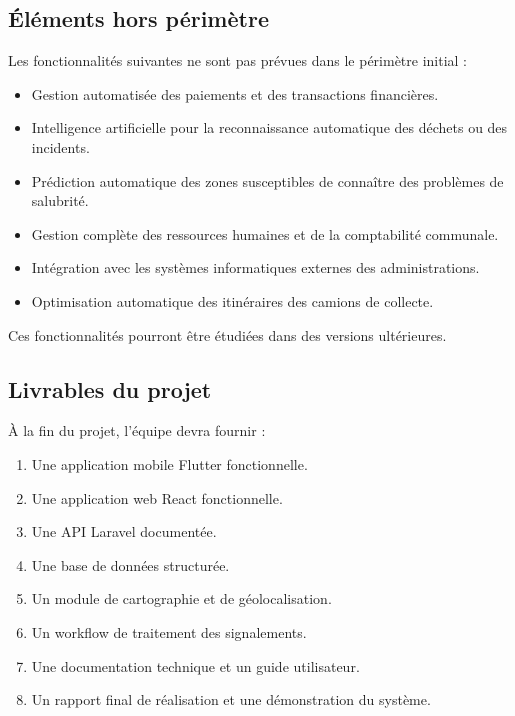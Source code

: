 \documentclass[11pt,a4paper,oneside]{report}
\begin{document}
	\subsection{Éléments hors périmètre}
	
	Les fonctionnalités suivantes ne sont pas prévues
	dans le périmètre initial :
	
	\begin{itemize}
		\item Gestion automatisée des paiements et
		des transactions financières.
		\item Intelligence artificielle pour la reconnaissance
		automatique des déchets ou des incidents.
		\item Prédiction automatique des zones susceptibles
		de connaître des problèmes de salubrité.
		\item Gestion complète des ressources humaines
		et de la comptabilité communale.
		\item Intégration avec les systèmes informatiques
		externes des administrations.
		\item Optimisation automatique des itinéraires
		des camions de collecte.
	\end{itemize}
	
	Ces fonctionnalités pourront être étudiées dans
	des versions ultérieures.
	
	\subsection{Livrables du projet}
	
	À la fin du projet, l'équipe devra fournir :
	
	\begin{enumerate}
		\item Une application mobile Flutter fonctionnelle.
		\item Une application web React fonctionnelle.
		\item Une API Laravel documentée.
		\item Une base de données structurée.
		\item Un module de cartographie et de géolocalisation.
		\item Un workflow de traitement des signalements.
		\item Une documentation technique et un guide utilisateur.
		\item Un rapport final de réalisation et une démonstration
		du système.
	\end{enumerate}
	
\end{document}
